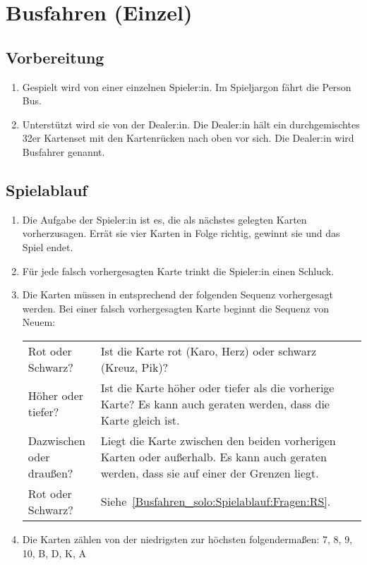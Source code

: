 \chapter{Busfahren (Einzel)}\label{Busfahren_solo}
\section{Vorbereitung}
\begin{enumerate}[label={(\arabic*)}]
    \item
    Gespielt wird von einer einzelnen Spieler:in.
    Im Spieljargon \glqq{} fährt die Person Bus\grqq{}.

    \item
    Unterstützt wird sie von der Dealer:in.
    Die Dealer:in hält ein durchgemischtes 32er Kartenset mit den Kartenrücken nach oben vor sich.
    Die Dealer:in wird \glqq{} Busfahrer\grqq{} genannt.
\end{enumerate}

\section{Spielablauf}
\begin{enumerate}[label={(\arabic*)}]
    \item
    Die Aufgabe der Spieler:in ist es, die als nächstes gelegten Karten vorherzusagen.
    Errät sie vier Karten in Folge richtig, gewinnt sie und das Spiel endet.
    
    \item
    Für jede falsch vorhergesagten Karte trinkt die Spieler:in einen Schluck.
    
    \item
    Die Karten müssen in entsprechend der folgenden Sequenz vorhergesagt werden.
    Bei einer falsch vorhergesagten Karte beginnt die Sequenz von Neuem:

    \begin{tabulary}{\textwidth}{lL}
        Rot oder Schwarz? & Ist die Karte rot (Karo, Herz) oder schwarz (Kreuz, Pik)? \label{Busfahren_solo:Spielablauf:Fragen:RS} \\
        Höher oder tiefer? & Ist die Karte höher oder tiefer als die vorherige Karte?
        Es kann auch geraten werden, dass die Karte gleich ist. \\
        Dazwischen oder draußen? & Liegt die Karte zwischen den beiden vorherigen Karten oder außerhalb.
        Es kann auch geraten werden, dass sie auf einer der Grenzen liegt. \\
        Rot oder Schwarz? & Siehe~\ref{Busfahren_solo:Spielablauf:Fragen:RS}. \\
    \end{tabulary}

    \item
    Die Karten zählen von der niedrigsten zur höchsten folgendermaßen: 7, 8, 9, 10, B, D, K, A
\end{enumerate}
